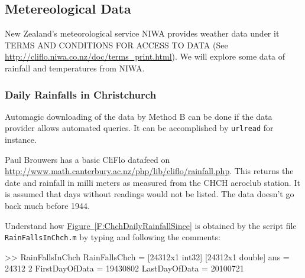 \subsection{Metereological Data}

New Zealand's meteorological service NIWA provides weather data under it TERMS AND CONDITIONS FOR ACCESS TO DATA (See \url{http://cliflo.niwa.co.nz/doc/terms_print.html}).  We will explore some data of rainfall and temperatures from NIWA.

\subsubsection{Daily Rainfalls in Christchurch}


Automagic downloading of the data by {\sf Method B} can be done if the data provider allows automated queries.  It can be accomplished by {\tt urlread} for instance.  %




Paul Brouwers has a basic CliFlo datafeed on \url{http://www.math.canterbury.ac.nz/php/lib/cliflo/rainfall.php}.  %
This returns the date and rainfall in milli meters as measured from the CHCH aeroclub station. It is assumed that days without readings would not be listed. %
The data doesn't go back much before 1944.



\begin{labwork}\label{LW:ChchDailyRainfallSince}
Understand how \hyperref[F:ChchDailyRainfallSince]{Figure~\ref*{F:ChchDailyRainfallSince}} is obtained by the script file {\tt RainFallsInChch.m} by typing and following the comments:

\begin{VrbM}
>> RainFallsInChch
RainFallsChch =     [24312x1 int32]    [24312x1 double]
ans =       24312           2
FirstDayOfData =    19430802
LastDayOfData =    20100721
\end{VrbM}

\end{labwork}

